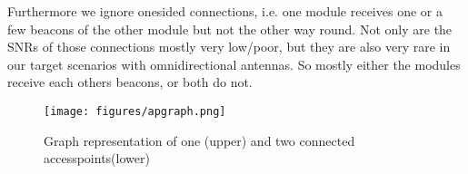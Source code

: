     Furthermore we ignore onesided connections, i.e. one module receives one or a few beacons of the other module but not the other way round.
    Not only are the SNRs of those connections mostly very low/poor, but they are also very rare in our target scenarios with omnidirectional antennas.
    So mostly either the modules receive each others beacons, or both do not.
    
    \begin{figure}[th!]
      \centering
      \texttt{[image: figures/apgraph.png]}
      \caption{Graph representation of one (upper) and two connected accesspoints(lower)}
      \label{fig:apgraph}
    \end{figure}
